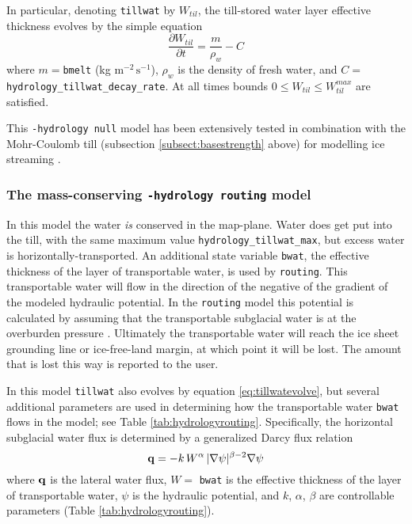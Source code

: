 In particular, denoting \texttt{tillwat} by $W_{til}$, the till-stored water layer effective thickness evolves by the simple equation
\begin{equation}  \label{eq:tillwatevolve}
  \frac{\partial W_{til}}{\partial t} = \frac{m}{\rho_w} - C
\end{equation}
where $m=$\texttt{bmelt} (kg $\text{m}^{-2}\,\text{s}^{-1}$), $\rho_w$ is the density of fresh water, and $C=$\texttt{hydrology_tillwat_decay_rate}.  At all times bounds $0 \le W_{til} \le W_{til}^{max}$ are satisfied.

This \texttt{-hydrology null} model has been extensively tested in combination with the Mohr-Coulomb till (subsection \ref{subsect:basestrength} above) for modelling ice streaming \cite[among others]{AschwandenAdalgeirsdottirKhroulev,BBssasliding}.

\subsubsection*{The mass-conserving \texttt{-hydrology routing} model}  In this model the water \emph{is} conserved in the map-plane.  Water does get put into the till, with the same maximum value \texttt{hydrology_tillwat_max}, but excess water is horizontally-transported.  An additional state variable \texttt{bwat}, the effective thickness of the layer of transportable water, is used by \texttt{routing}.  This transportable water will flow in the direction of the negative of the gradient of the modeled hydraulic potential.  In the \texttt{routing} model this potential is calculated by assuming that the transportable subglacial water is at the overburden pressure \cite{Siegertetal2009}.  Ultimately the transportable water will reach the ice sheet grounding line or ice-free-land margin, at which point it will be lost.  The amount that is lost this way is reported to the user.

In this model \texttt{tillwat} also evolves by equation \eqref{eq:tillwatevolve}, but several additional parameters are used in determining how the transportable water \texttt{bwat} flows in the model; see Table \ref{tab:hydrologyrouting}.  Specifically, the horizontal subglacial water flux is determined by a generalized Darcy flux relation \cite{Clarke05,Schoofetal2012}
\begin{equation}  \label{eq:flux}
\mathbf{q} = - k\, W^\alpha\, |\nabla \psi|^{\beta-2} \nabla \psi
\end{equation}
where $\mathbf{q}$ is the lateral water flux, $W=$ \texttt{bwat} is the effective thickness of the layer of transportable water, $\psi$ is the hydraulic potential, and $k$, $\alpha$, $\beta$ are controllable parameters (Table \ref{tab:hydrologyrouting}).

